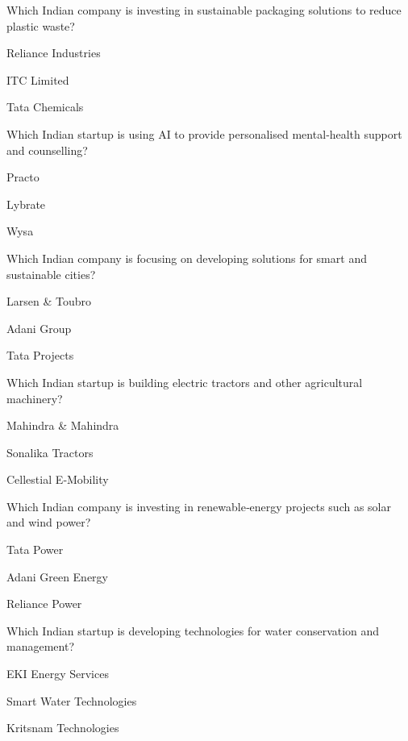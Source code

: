 \begin{enhancedmcq}{Which Indian company is investing in sustainable packaging solutions to reduce plastic waste?}
\item Reliance Industries
\item ITC Limited
\item Tata Chemicals

\end{enhancedmcq}
\begin{enhancedmcq}{Which Indian startup is using AI to provide personalised mental‑health support and counselling?}
\item Practo
\item Lybrate
\item Wysa

\end{enhancedmcq}
\begin{enhancedmcq}{Which Indian company is focusing on developing solutions for smart and sustainable cities?}
\item Larsen & Toubro
\item Adani Group
\item Tata Projects

\end{enhancedmcq}
\begin{enhancedmcq}{Which Indian startup is building electric tractors and other agricultural machinery?}
\item Mahindra & Mahindra
\item Sonalika Tractors
\item Cellestial E‑Mobility

\end{enhancedmcq}
\begin{enhancedmcq}{Which Indian company is investing in renewable‑energy projects such as solar and wind power?}
\item Tata Power
\item Adani Green Energy
\item Reliance Power

\end{enhancedmcq}
\begin{enhancedmcq}{Which Indian startup is developing technologies for water conservation and management?}
\item EKI Energy Services
\item Smart Water Technologies
\item Kritsnam Technologies

\end{enhancedmcq}

